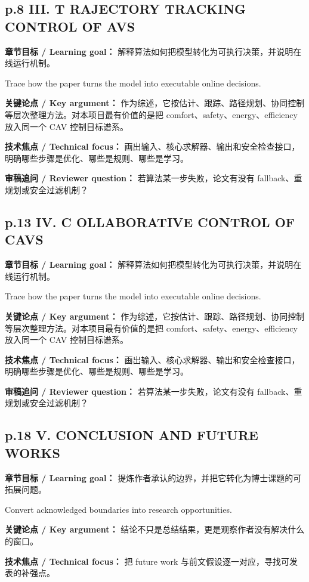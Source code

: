 \documentclass[UTF8,a4paper,11pt,fontset=fandol]{ctexart}
\begin{document}
\subsection*{p.8 III. T RAJECTORY TRACKING CONTROL OF AVS}
\textbf{章节目标 / Learning goal：} 解释算法如何把模型转化为可执行决策，并说明在线运行机制。

Trace how the paper turns the model into executable online decisions.

\textbf{关键论点 / Key argument：} 作为综述，它按估计、跟踪、路径规划、协同控制等层次整理方法。对本项目最有价值的是把 comfort、safety、energy、efficiency 放入同一个 CAV 控制目标谱系。

\textbf{技术焦点 / Technical focus：} 画出输入、核心求解器、输出和安全检查接口，明确哪些步骤是优化、哪些是规则、哪些是学习。

\textbf{审稿追问 / Reviewer question：} 若算法某一步失败，论文有没有 fallback、重规划或安全过滤机制？

\subsection*{p.13 IV. C OLLABORATIVE CONTROL OF CAVS}
\textbf{章节目标 / Learning goal：} 解释算法如何把模型转化为可执行决策，并说明在线运行机制。

Trace how the paper turns the model into executable online decisions.

\textbf{关键论点 / Key argument：} 作为综述，它按估计、跟踪、路径规划、协同控制等层次整理方法。对本项目最有价值的是把 comfort、safety、energy、efficiency 放入同一个 CAV 控制目标谱系。

\textbf{技术焦点 / Technical focus：} 画出输入、核心求解器、输出和安全检查接口，明确哪些步骤是优化、哪些是规则、哪些是学习。

\textbf{审稿追问 / Reviewer question：} 若算法某一步失败，论文有没有 fallback、重规划或安全过滤机制？

\subsection*{p.18 V. CONCLUSION AND FUTURE WORKS}
\textbf{章节目标 / Learning goal：} 提炼作者承认的边界，并把它转化为博士课题的可拓展问题。

Convert acknowledged boundaries into research opportunities.

\textbf{关键论点 / Key argument：} 结论不只是总结结果，更是观察作者没有解决什么的窗口。

\textbf{技术焦点 / Technical focus：} 把 future work 与前文假设逐一对应，寻找可发表的补强点。
\end{document}
